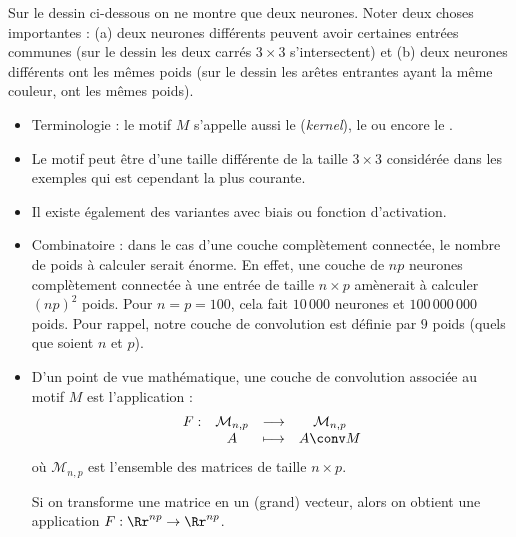 \documentclass[11pt,class=report,crop=false]{standalone}
\begin{document}
Sur le dessin ci-dessous on ne montre que deux neurones.
Noter deux choses importantes : (a) deux neurones différents peuvent avoir certaines entrées communes (sur le dessin les deux carrés $3\times 3$ s'intersectent) et (b) deux neurones différents ont les mêmes poids (sur le dessin les arêtes entrantes ayant la même couleur, ont les mêmes poids).


   

\begin{remarque*}
\sauteligne
\begin{itemize}
  \item Terminologie : le motif $M$ s'appelle aussi le  (\emph{kernel}), le  ou encore le .
  
  \item Le motif peut être d'une taille différente de la taille $3\times 3$ considérée dans les exemples qui est cependant la plus courante.
  
  \item Il existe également des variantes avec biais ou fonction d'activation.
  
  \item Combinatoire : dans le cas d'une couche complètement connectée, le nombre de poids à calculer serait énorme. En effet, une couche de $np$ neurones complètement connectée à une entrée de taille $n\times p$ amènerait à calculer $(np)^2$ poids.
  Pour $n=p=100$, cela fait $10\,000$ neurones et $100 \, 000\,000$ poids. Pour rappel, notre couche de convolution est définie par $9$ poids (quels que soient $n$ et $p$).
  
  \item D'un point de vue mathématique, une couche de convolution associée au motif $M$ est l'application :
  $$\begin{array}{cccc}
  F : & \mathcal{M}_{n,p} & \longrightarrow & \mathcal{M}_{n,p} \\
      & A & \longmapsto & A \conv M
  \end{array}$$
  où $\mathcal{M}_{n,p}$ est l'ensemble des matrices de taille $n \times p$.
  
  Si on transforme une matrice en un (grand) vecteur, alors on obtient une application
  $F : \Rr^{np} \to \Rr^{np}$.
  
\end{itemize}
\end{remarque*}


\end{document}
